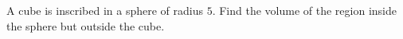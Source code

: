 A cube is inscribed in a sphere of radius $5$. Find the volume of the region inside the sphere but outside the cube.
